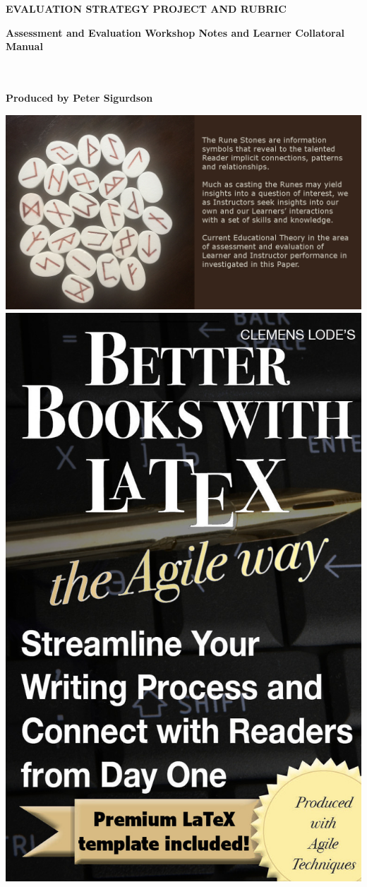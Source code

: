 \vspace{3cm}
  \begin{center}
	\bfseries \sffamily \Huge EVALUATION STRATEGY PROJECT AND RUBRIC\par
	\bfseries \LARGE Assessment and Evaluation Workshop Notes and Learner Collatoral Manual\par
~\\
	~\\
	\bfseries \small Produced by Peter Sigurdson\par
	
    \ifxetex
		\includegraphics[width=1\textwidth]{images/RuneStones.png}
	\else
    	\includegraphics{images/cover.jpg}
    \fi
  \end{center}

